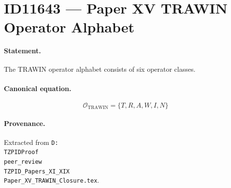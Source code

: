 \section*{ID11643 --- Paper XV TRAWIN Operator Alphabet}

\paragraph{Statement.}
The TRAWIN operator alphabet consists of six operator classes.

\paragraph{Canonical equation.}
\[
\mathcal{O}_{\mathrm{TRAWIN}}=\{T,R,A,W,I,N\}
\]

\paragraph{Provenance.}
Extracted from \texttt{D:\\TZPIDProof\\peer\_review\\TZPID\_Papers\_XI\_XIX\\Paper\_XV\_TRAWIN\_Closure.tex}.
